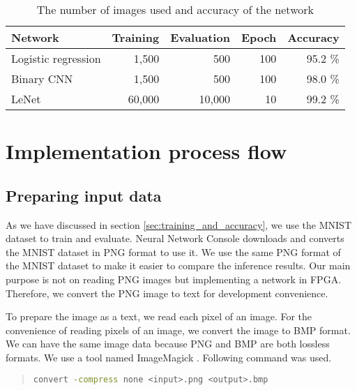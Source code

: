   \begin{table}[tbp]
    \centering
    \caption{The number of images used and accuracy of the network}
    \label{tab:number_mnist}
    \begin{tabular}{l|rrrr}
      \hline\hline
      Network             & Training & Evaluation & Epoch & Accuracy \\
      \hline
      Logistic regression &  1,500   &    500     & 100   & 95.2 \% \\
      Binary CNN          &  1,500   &    500     & 100   & 98.0 \% \\
      LeNet               & 60,000   & 10,000     & 10    & 99.2 \% \\
      \hline
    \end{tabular}
  \end{table}



\section{Implementation process flow}

\subsection{Preparing input data}
As we have discussed in section \ref{sec:training_and_accuracy}, we use the MNIST dataset to train and evaluate. Neural Network Console downloads and converts the MNIST dataset in PNG format to use it. We use the same PNG format of the MNIST dataset to make it easier to compare the inference results. Our main purpose is not on reading PNG images but implementing a network in FPGA. Therefore, we convert the PNG image to text for development convenience.

To prepare the image as a text, we read each pixel of an image. For the convenience of reading pixels of an image, we convert the image to BMP format. We can have the same image data because PNG and BMP are both lossless formats. We use a tool named ImageMagick \cite{imagemagick}. Following command was used.

\begin{quote}
  \begin{lstlisting}[language=bash, numbers=none, frame=l]
convert -compress none <input>.png <output>.bmp
  \end{lstlisting}
\end{quote}

